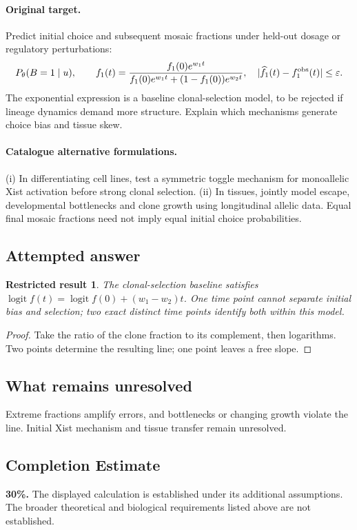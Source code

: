 \documentclass[11pt]{article}
\newtheorem{attemptresult}{Restricted result}[section]
\begin{document}
\paragraph{Original target.}
Predict initial choice and subsequent mosaic fractions under held-out dosage or regulatory perturbations:
\[
P_\theta(B=1\mid u),\qquad
f_1(t)=\frac{f_1(0)e^{w_1t}}{f_1(0)e^{w_1t}+(1-f_1(0))e^{w_2t}},
\quad |\widehat f_1(t)-f_1^{\rm obs}(t)|\leq\varepsilon.
\]
The exponential expression is a baseline clonal-selection model, to be rejected if lineage dynamics demand more structure. Explain which mechanisms generate choice bias and tissue skew.
\paragraph{Catalogue alternative formulations.}
(i) In differentiating cell lines, test a symmetric toggle mechanism for monoallelic Xist activation before strong clonal selection. (ii) In tissues, jointly model escape, developmental bottlenecks and clone growth using longitudinal allelic data. Equal final mosaic fractions need not imply equal initial choice probabilities.
\subsection{Attempted answer}
\begin{attemptresult}
The clonal-selection baseline satisfies $\operatorname{logit}f(t)=\operatorname{logit}f(0)+(w_1-w_2)t$. One time point cannot separate initial bias and selection; two exact distinct time points identify both within this model.
\end{attemptresult}
\begin{proof}
Take the ratio of the clone fraction to its complement, then logarithms. Two points determine the resulting line; one point leaves a free slope.
\end{proof}
\subsection{What remains unresolved}
Extreme fractions amplify errors, and bottlenecks or changing growth violate the line. Initial Xist mechanism and tissue transfer remain unresolved.
\subsection{Completion Estimate}
\textbf{30\%.} The displayed calculation is established under its additional assumptions. The broader theoretical and biological requirements listed above are not established.
\end{document}
